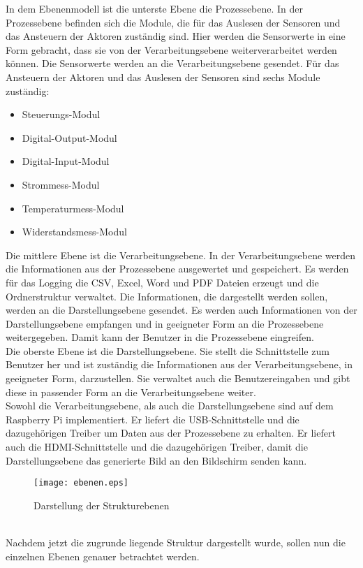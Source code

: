 In dem Ebenenmodell ist die unterste Ebene die Prozessebene. In der Prozessebene befinden sich die Module, die für das Auslesen der Sensoren und das Ansteuern der Aktoren zuständig sind. Hier werden die Sensorwerte in eine Form gebracht, dass sie von der Verarbeitungsebene weiterverarbeitet werden können. Die Sensorwerte werden an die Verarbeitungsebene gesendet. Für das Ansteuern der Aktoren und das Auslesen der Sensoren sind sechs Module zuständig:
\begin{itemize}
\itemsep0em
	\item Steuerungs-Modul
	\item Digital-Output-Modul
	\item Digital-Input-Modul
	\item Strommess-Modul
	\item Temperaturmess-Modul
	\item Widerstandsmess-Modul
\end{itemize}
Die mittlere Ebene ist die Verarbeitungsebene. In der Verarbeitungsebene werden die Informationen aus der Prozessebene ausgewertet und gespeichert. Es werden für das Logging die CSV, Excel, Word und PDF Dateien erzeugt und die Ordnerstruktur verwaltet. Die Informationen, die dargestellt werden sollen, werden an die Darstellungsebene gesendet. Es werden auch Informationen von der Darstellungsebene empfangen und in geeigneter Form an die Prozessebene weitergegeben. Damit kann der Benutzer in die Prozessebene eingreifen.
\\
Die oberste Ebene ist die Darstellungsebene. Sie stellt die Schnittstelle zum Benutzer her und ist zuständig die Informationen aus der Verarbeitungsebene, in geeigneter Form, darzustellen. Sie verwaltet auch die Benutzereingaben und gibt diese in passender Form an die Verarbeitungsebene weiter.
\\
Sowohl die Verarbeitungsebene, als auch die Darstellungsebene sind auf dem Raspberry Pi implementiert. Er liefert die USB-Schnittstelle und die dazugehörigen Treiber um Daten aus der Prozessebene zu erhalten. Er liefert auch die HDMI-Schnittstelle und die dazugehörigen Treiber, damit die Darstellungsebene das generierte Bild an den Bildschirm senden kann.
\begin{figure}[h]
\vspace{24pt}
\centering
\texttt{[image: ebenen.eps]}
\caption{Darstellung der Strukturebenen}
\label{abbildung_ebenen}
\vspace{24pt}
\end{figure}
\\
\noindent
Nachdem jetzt die zugrunde liegende Struktur dargestellt wurde, sollen nun die einzelnen Ebenen genauer betrachtet werden.

